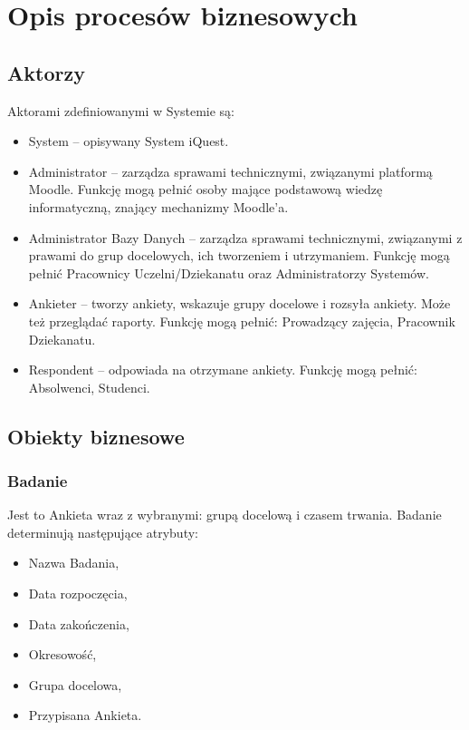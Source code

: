 \chapter{Opis procesów biznesowych}
\label{Chapter2}

\section{Aktorzy}
\label{Chapter21}

Aktorami zdefiniowanymi w Systemie są:
\begin{itemize}
\item System -- opisywany System iQuest.
\item Administrator -- zarządza sprawami technicznymi, związanymi platformą Moodle. Funkcję mogą pełnić osoby mające podstawową wiedzę informatyczną, znający mechanizmy Moodle'a.
\item Administrator Bazy Danych -- zarządza sprawami technicznymi, związanymi z prawami do grup docelowych, ich tworzeniem i utrzymaniem. Funkcję mogą pełnić Pracownicy Uczelni\slash Dziekanatu oraz Administratorzy Systemów.
\item Ankieter -- tworzy ankiety, wskazuje grupy docelowe i rozsyła ankiety. Może też przeglądać raporty. Funkcję mogą pełnić: Prowadzący zajęcia, Pracownik Dziekanatu.
\item Respondent -- odpowiada na otrzymane ankiety. Funkcję mogą pełnić: Absolwenci, Studenci.
\end{itemize}

\section{Obiekty biznesowe}
\label{Chapter22}

\subsection{Badanie}

Jest to Ankieta wraz z wybranymi: grupą docelową i czasem trwania. Badanie determinują następujące atrybuty:

\begin{itemize}
\item Nazwa Badania,
\item Data rozpoczęcia,
\item Data zakończenia,
\item Okresowość,
\item Grupa docelowa,
\item Przypisana Ankieta.
\end{itemize}


